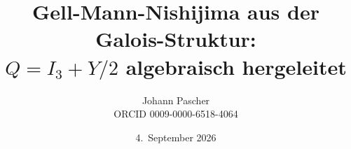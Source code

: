 \documentclass[11pt,a4paper]{report}
\title{Gell-Mann-Nishijima aus der Galois-Struktur:\\[0.5em]
  \large $Q = I_3 + Y/2$ algebraisch hergeleitet}
\date{4.~September 2026}
\author{Johann Pascher\\\small ORCID 0009-0000-6518-4064}
\begin{document}
\renewcommand{\thechapter}{}
\renewcommand{\thesection}{\arabic{section}}
\maketitle
\tableofcontents

\end{document}
